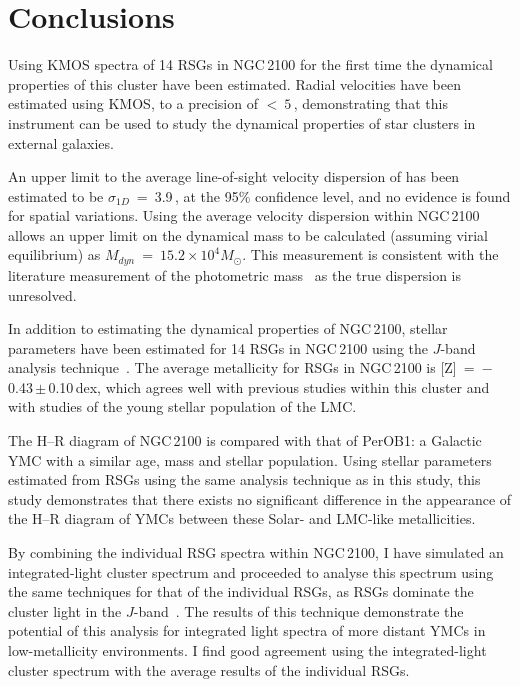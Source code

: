 
\section{Conclusions} %
\label{sec:conclusions}

Using KMOS spectra of 14 RSGs in NGC\,2100 for the first time the dynamical properties of this cluster have been estimated.
Radial velocities have been estimated using KMOS, to a precision of $<~5$\,\kms, demonstrating that this instrument can be used to study the dynamical properties of star clusters in external galaxies.

An upper limit to the average line-of-sight velocity dispersion of has been estimated to be $\sigma_{1D}$~=~3.9\,\kms, at the 95\% confidence level, and no evidence is found for spatial variations.
Using the average velocity dispersion within NGC\,2100 allows an upper limit on the dynamical mass to be calculated
(assuming virial equilibrium) as $M_{dyn}$~=~$15.2\times 10^{4}M_{\odot}$.
This measurement is consistent with the literature measurement of the photometric mass~\citep{2005ApJS..161..304M} as the true dispersion is unresolved.

In addition to estimating the dynamical properties of NGC\,2100,
stellar parameters have been estimated for 14 RSGs in NGC\,2100 using the $J$-band analysis technique~\citep{2010MNRAS.407.1203D}.
The average metallicity for RSGs in NGC\,2100 is [Z]~=~$-$0.43\,$\pm$\,0.10\,dex, which agrees well with previous studies within this cluster and with studies of the young stellar population of the LMC.

The H--R diagram of NGC\,2100 is compared with that of PerOB1: a Galactic YMC with a similar age, mass and stellar population.
Using stellar parameters estimated from RSGs using the same analysis technique as in this study,
this study demonstrates that there exists no significant difference in the appearance of the H--R diagram of YMCs between these Solar- and LMC-like metallicities.

By combining the individual RSG spectra within NGC\,2100, I have simulated an integrated-light cluster spectrum and proceeded to analyse this spectrum using the same techniques for that of the individual RSGs, as RSGs dominate the cluster light in the $J$-band~\citep{2013MNRAS.430L..35G}.
The results of this technique demonstrate the potential of this analysis for integrated light spectra of more distant YMCs in low-metallicity environments.
I find good agreement using the integrated-light cluster spectrum with the average results of the individual RSGs.


